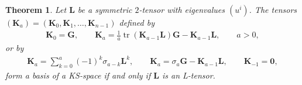 \documentclass[10pt,a4paper]{amsart}
\def\bs{\boldsymbol}
\numberwithin{equation}{section}
\newtheorem{Theorem}{Theorem}[section]
 { \theoremstyle{definition}
\newtheorem{Notation}[Theorem]{Notation}
\newtheorem{Example}[Theorem]{Example}
\newtheorem{Remark}[Theorem]{Remark}
\newtheorem{Remarks}[Theorem]{Remarks}
 }
\begin{document}
\begin{Theorem}\label{t:8.1}
Let $\bs L$ be a symmetric $2$-tensor with eigenvalues $(u^i)$. The tensors $(\bs K_a)=(\bs K_0,\bs K_1,\ldots,\bs K_{n-1})$ defined by
\begin{gather}
\bs K_0=\bs G,\qquad
\bs K_a=\tfrac 1a \operatorname{tr}(\bs K_{a-1}\bs L)\bs G-\bs K_{a-1}\bs L, \qquad { {a>0}},
\label{(8.7)}
\end{gather}
or by
\begin{gather}
\bs K_a=\sum_{k=0}^a (-1)^k\sigma_{a-k}\bs L^k, \qquad \bs K_a=\sigma_a \bs G-\bs K_{a-1}\bs L, \qquad \bs K_{-1}=\bs 0,
\label{(8.8)}
\end{gather}
form a basis of a KS-space if and only if $\bs L$ is an L-tensor.
\end{Theorem}
\end{document}
